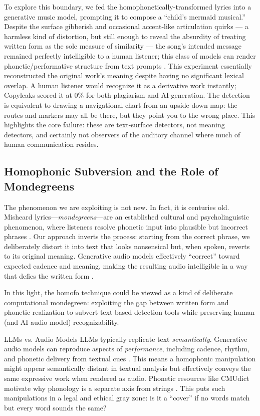 \documentclass[12pt]{article}
\begin{document}
To explore this boundary, we fed the homophonetically-transformed lyrics into a generative music model, prompting it to compose a “child’s mermaid musical.” Despite the surface gibberish and occasional accent-like articulation quirks — a harmless kind of distortion, but still enough to reveal the absurdity of treating written form as the sole measure of similarity — the song's intended message remained perfectly intelligible to a human listener; this class of models can render phonetic/performative structure from text prompts \cite{musicgen}. This experiment essentially reconstructed the original work's meaning despite having no significant lexical overlap. A human listener would recognize it as a derivative work instantly; Copyleaks scored it at 0\% for both plagiarism and AI-generation. The detection is equivalent to drawing a navigational chart from an upside-down map: the routes and markers may all be there, but they point you to the wrong place.  This highlights the core failure: these are text-surface detectors, not meaning detectors, and certainly not observers of the auditory channel where much of human communication resides.

\subsection{Homophonic Subversion and the Role of Mondegreens}
The phenomenon we are exploiting is not new. In fact, it is centuries old. Misheard lyrics---\emph{mondegreens}---are an established cultural and psycholinguistic phenomenon, where listeners resolve phonetic input into plausible but incorrect phrases \cite{mondegreen-def,mondegreen-research}. Our approach inverts the process: starting from the correct phrase, we deliberately distort it into text that looks nonsensical but, when spoken, reverts to its original meaning. Generative audio models effectively ``correct'' toward expected cadence and meaning, making the resulting audio intelligible in a way that defies the written form \cite{musicgen}.


In this light, the homofo technique could be viewed as a kind of deliberate computational mondegreen: exploiting the gap between written form and phonetic realization to subvert text-based detection tools while preserving human (and AI audio model) recognizability.


\begin{sidebar}{LLMs vs. Audio Models}
LLMs typically replicate text \emph{semantically}. Generative audio models can reproduce aspects of \emph{performance}, including cadence, rhythm, and phonetic delivery from textual cues \cite{musicgen}. This means a homophonic manipulation might appear semantically distant in textual analysis but effectively conveys the same expressive work when rendered as audio. Phonetic resources like CMUdict motivate why phonology is a separate axis from strings \cite{cmudict}.  This puts such manipulations in a legal and ethical gray zone: is it a “cover” if no words match but every word sounds the same?
\end{sidebar}
\end{document}
